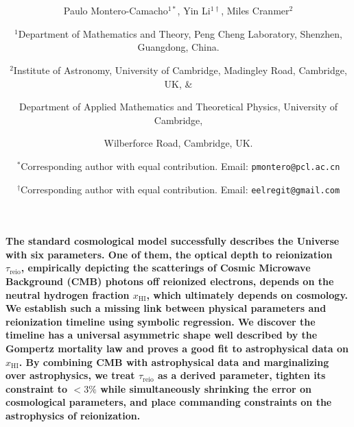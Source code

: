 \documentclass[12pt]{article}
\title{\bfseries \boldmath \scititle}
\author{
Paulo Montero-Camacho$^{1\ast}$,
Yin Li$^{1\dagger}$,
Miles Cranmer$^2$\and
\small$^{1}$Department of Mathematics and Theory, Peng Cheng Laboratory,
Shenzhen, Guangdong, China.\and
\small$^{2}$Institute of Astronomy, University of Cambridge, Madingley
Road, Cambridge, UK, \&\and
\small Department of Applied Mathematics and Theoretical Physics,
University of Cambridge,\and
\small Wilberforce Road, Cambridge, UK.\and
\small$^\ast$Corresponding author with equal contribution. Email:
\texttt{pmontero@pcl.ac.cn}\and
\small$^\dagger$Corresponding author with equal contribution. Email:
\texttt{eelregit@gmail.com}
}
\date{}
\renewenvironment{abstract}{\quotation}{\endquotation}
\newcommand{\zetaUV}{\zeta_\mathrm{UV}}
\newcommand{\HI}{\mathrm{HI}}
\newcommand{\reio}{\mathrm{reio}}
\begin{document}
\maketitle



\begin{abstract} \bfseries \boldmath
The standard cosmological model successfully describes the Universe with
six parameters.
One of them, the optical depth to reionization $\tau_\reio$, empirically
depicting the scatterings of Cosmic Microwave Background (CMB) photons
off reionized electrons, depends on the neutral hydrogen fraction
$x_\HI$, which ultimately depends on cosmology.
We establish such a missing link between physical parameters and
reionization timeline using symbolic regression.
We discover the timeline has a universal asymmetric shape well described
by the Gompertz mortality law and proves a good fit to astrophysical
data on $x_\HI$.
By combining CMB with astrophysical data and marginalizing over
astrophysics, we treat $\tau_\reio$ as a derived parameter, tighten its
constraint to $<3\%$ while simultaneously shrinking the error on
cosmological parameters, and place commanding constraints on the
astrophysics of reionization.
%
\end{abstract}
\end{document}
